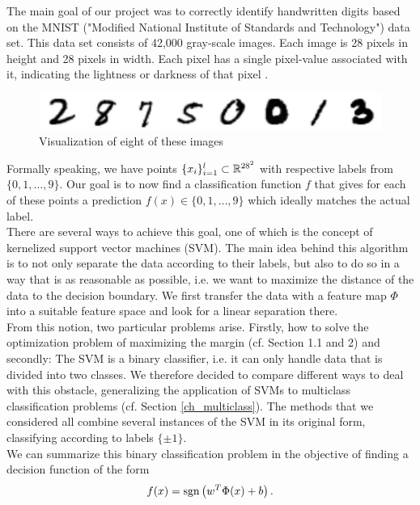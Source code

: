 The main goal of our project was to correctly identify handwritten digits based on the MNIST  ("Modified National Institute of Standards and Technology") data set.
This data set consists of 42,000 gray-scale images. Each image is 28 pixels in height and 28 pixels in width. Each pixel has a single pixel-value associated with it, indicating the lightness or darkness of that pixel \cite{kaggel}.

\begin{figure}[h]
	\includegraphics[width=1\textwidth, center]{Digits2}
	\caption{Visualization of eight of these images}
\end{figure}


Formally speaking, we have points  $\{x_i\}_{i=1}^l \subset \mathbb{R}^{28^2}$ with respective labels from $\{0,1,\ldots, 9\}$. Our goal is to now find a classification function $f$ that gives for each of these points a prediction $f(x) \in \{0,1,\ldots, 9\}$ which ideally matches the actual label.\\

There are several ways to achieve this goal, one of which is the concept of {kernelized} support vector machines (SVM). The main idea behind this algorithm is to not only separate the data according to their labels, but also to do so in a way that is as reasonable as possible, i.e. we want to maximize the distance of the data to the decision boundary. We first transfer the data with a feature map $\Phi$ into a suitable feature space and look for a linear separation there.\\

From this notion, two particular problems arise. Firstly, how to solve the optimization problem of maximizing the margin (cf. Section 1.1 and 2) and secondly: The SVM is a binary classifier, i.e. it can only handle data that is divided into two classes. We therefore decided to compare different ways to deal with this obstacle, generalizing the application of SVMs to multiclass  classification problems (cf. Section \ref{ch_multiclass}). The methods that we considered all combine several instances of the SVM in its original form, classifying according to labels $\{\pm 1\}$.\\

We can summarize this binary classification problem in the objective of finding a decision function of the form
\begin{equation*}
f(x) = \operatorname{sgn} \left(w^T\Phi(x) + b\right).
\end{equation*}


